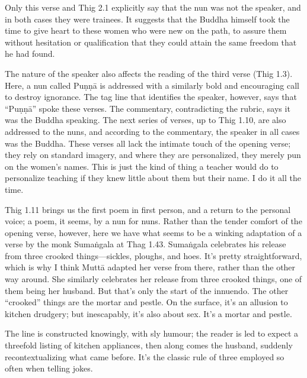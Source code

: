 \documentclass[12pt,openany]{book}%
\begin{document}
Only this verse and Thig 2.1 explicitly say that the nun was not the speaker, and in both cases they were trainees. It suggests that the Buddha himself took the time to give heart to these women who were new on the path, to assure them without hesitation or qualification that they could attain the same freedom that he had found.

The nature of the speaker also affects the reading of the third verse (Thig 1.3). Here, a nun called \textsanskrit{Puṇṇā} is addressed with a similarly bold and encouraging call to destroy ignorance. The tag line that identifies the speaker, however, says that “\textsanskrit{Puṇṇā}” spoke these verses. The commentary, contradicting the rubric, says it was the Buddha speaking. The next series of verses, up to Thig 1.10, are also addressed to the nuns, and according to the commentary, the speaker in all cases was the Buddha. These verses all lack the intimate touch of the opening verse; they rely on standard imagery, and where they are personalized, they merely pun on the women’s names. This is just the kind of thing a teacher would do to personalize teaching if they knew little about them but their name. I do it all the time.

Thig 1.11 brings us the first poem in first person, and a return to the personal voice; a poem, it seems, by a nun for nuns. Rather than the tender comfort of the opening verse, however, here we have what seems to be a winking adaptation of a verse by the monk \textsanskrit{Sumaṅgala} at Thag 1.43. \textsanskrit{Sumaṅgala} celebrates his release from three crooked things—sickles, ploughs, and hoes. It’s pretty straightforward, which is why I think \textsanskrit{Muttā} adapted her verse from there, rather than the other way around. She similarly celebrates her release from three crooked things, one of them being her husband. But that’s only the start of the innuendo. The other “crooked” things are the mortar and pestle. On the surface, it’s an allusion to kitchen drudgery; but inescapably, it’s also about sex. It’s a mortar and pestle.

The line is constructed knowingly, with sly humour; the reader is led to expect a threefold listing of kitchen appliances, then along comes the husband, suddenly recontextualizing what came before. It’s the classic rule of three employed so often when telling jokes.
\end{document}
